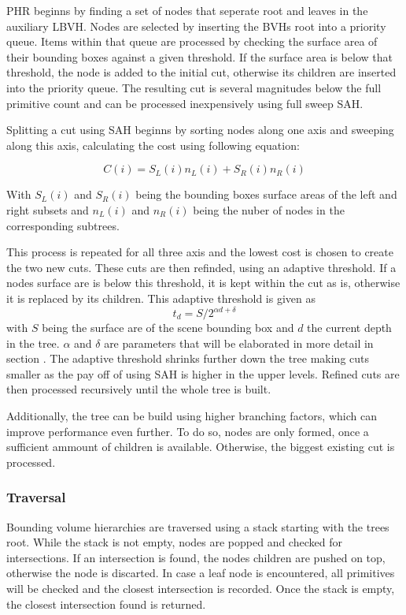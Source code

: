 PHR beginns by finding a set of nodes that seperate root and leaves in the auxiliary LBVH. Nodes are selected by inserting the BVHs root into a priority queue. Items within that queue are processed by checking the surface area of their bounding boxes against a given threshold. If the surface area is below that threshold, the node is added to the initial cut, otherwise its children are inserted into the priority queue. The resulting cut is several magnitudes below the full primitive count and can be processed inexpensively using full sweep SAH.

Splitting a cut using SAH beginns by sorting nodes along one axis and sweeping along this axis, calculating the cost using following equation:

\[C(i)=S_L(i)n_L(i)+S_R(i)n_R(i)\]

With $S_L(i)$ and $S_R(i)$ being the bounding boxes surface areas of the left and right subsets and $n_L(i)$ and $n_R(i)$ being the nuber of nodes in the corresponding subtrees.

This process is repeated for all three axis and the lowest cost is chosen to create the two new cuts. These cuts are then refinded, using an adaptive threshold. If a nodes surface are is below this threshold, it is kept within the cut as is, otherwise it is replaced by its children. 
This adaptive threshold is given as 
\[t_d = S /{2^{\alpha d + \delta}}\]
with $S$ being the surface are of the scene bounding box and $d$ the current depth in the tree. $\alpha$ and $\delta$ are parameters that will be elaborated in more detail in section .
The adaptive threshold shrinks further down the tree making cuts smaller as the pay off of using SAH is higher in the upper levels. Refined cuts are then processed recursively until the whole tree is built. 

Additionally, the tree can be build using higher branching factors, which can improve performance even further. To do so, nodes are only formed, once a sufficient ammount of children is available. Otherwise, the biggest existing cut is processed. 

\subsubsection{Traversal}
\label{traversal}
Bounding volume hierarchies are traversed using a stack starting with the trees root. While the stack is not empty, nodes are popped and checked for intersections. If an intersection is found, the nodes children are pushed on top, otherwise the node is discarted. In case a leaf node is encountered, all primitives will be checked and the closest intersection is recorded. Once the stack is empty, the closest intersection found is returned. 

